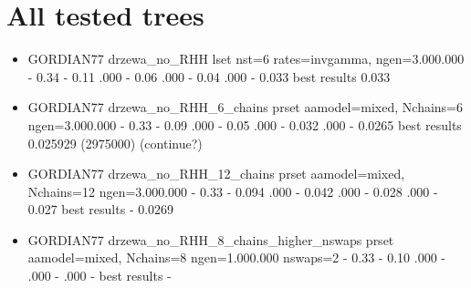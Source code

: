     \section{All tested trees}
\begin{itemize}
    \item GORDIAN77 \newline
drzewa\_no\_RHH \newline
lset nst=6 rates=invgamma, ngen=3.000.000  - 0.34  - 0.11 .000 - 0.06 .000 - 0.04 .000 - 0.033 \newline
best results 0.033


    \item GORDIAN77 \newline
drzewa\_no\_RHH\_6\_chains \newline
prset aamodel=mixed, Nchains=6 ngen=3.000.000  - 0.33  - 0.09 .000 - 0.05 .000 - 0.032 .000 - 0.0265 \newline
best results 0.025929 (2975000) (continue?)


    \item GORDIAN77 \newline
drzewa\_no\_RHH\_12\_chains \newline
prset aamodel=mixed, Nchains=12 ngen=3.000.000  - 0.33  - 0.094 .000 - 0.042 .000 - 0.028 .000 - 0.027 \newline
best results - 0.0269

    \item GORDIAN77 \newline
drzewa\_no\_RHH\_8\_chains\_higher\_nswaps \newline
prset aamodel=mixed, Nchains=8 ngen=1.000.000 nswaps=2  - 0.33  - 0.10 .000 - .000 - .000 - \newline
best results -



\end{itemize}
